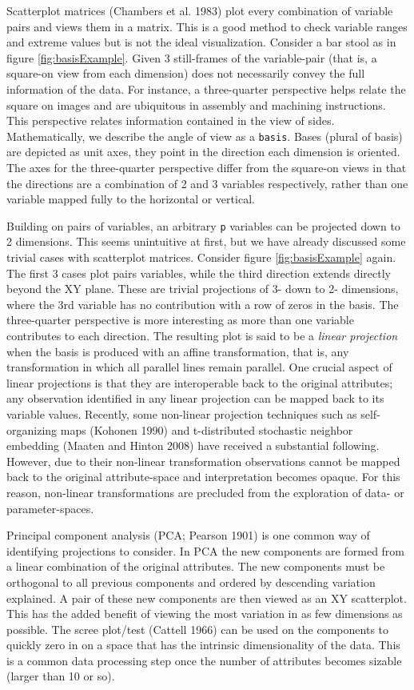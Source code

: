 \documentclass[11,]{article}
\begin{document}
Scatterplot matrices (Chambers et al. 1983) plot every combination of variable pairs and views them in a matrix. This is a good method to check variable ranges and extreme values but is not the ideal visualization. Consider a bar stool as in figure \ref{fig:basisExample}. Given 3 still-frames of the variable-pair (that is, a square-on view from each dimension) does not necessarily convey the full information of the data. For instance, a three-quarter perspective helps relate the square on images and are ubiquitous in assembly and machining instructions. This perspective relates information contained in the view of sides. Mathematically, we describe the angle of view as a \texttt{basis}. Bases (plural of basis) are depicted as unit axes, they point in the direction each dimension is oriented. The axes for the three-quarter perspective differ from the square-on views in that the directions are a combination of 2 and 3 variables respectively, rather than one variable mapped fully to the horizontal or vertical.

Building on pairs of variables, an arbitrary \texttt{p} variables can be projected down to 2 dimensions. This seems unintuitive at first, but we have already discussed some trivial cases with scatterplot matrices. Consider figure \ref{fig:basisExample} again. The first 3 cases plot pairs variables, while the third direction extends directly beyond the XY plane. These are trivial projections of 3- down to 2- dimensions, where the 3rd variable has no contribution with a row of zeros in the basis. The three-quarter perspective is more interesting as more than one variable contributes to each direction. The resulting plot is said to be a \emph{linear projection} when the basis is produced with an affine transformation, that is, any transformation in which all parallel lines remain parallel. One crucial aspect of linear projections is that they are interoperable back to the original attributes; any observation identified in any linear projection can be mapped back to its variable values. Recently, some non-linear projection techniques such as
self-organizing maps (Kohonen 1990) and t-distributed stochastic neighbor embedding (Maaten and Hinton 2008) have received a substantial following. However, due to their non-linear transformation observations cannot be mapped back to the original attribute-space and interpretation becomes opaque. For this reason, non-linear transformations are precluded from the exploration of data- or parameter-spaces.

Principal component analysis (PCA; Pearson 1901) is one common way of identifying projections to consider. In PCA the new components are formed from a linear combination of the original attributes. The new components must be orthogonal to all previous components and ordered by descending variation explained. A pair of these new components are then viewed as an XY scatterplot. This has the added benefit of viewing the most variation in as few dimensions as possible. The scree plot/test (Cattell 1966) can be used on the components to quickly zero in on a space that has the intrinsic dimensionality of the data. This is a common data processing step once the number of attributes becomes sizable (larger than 10 or so).
\end{document}
